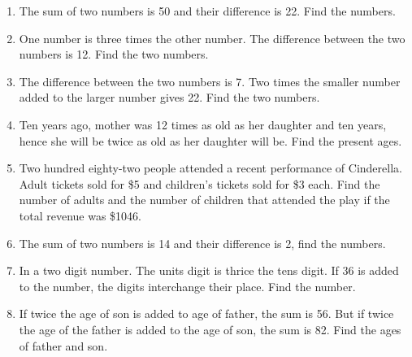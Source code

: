 \documentclass[12pt]{article}
\newenvironment{problem}[2][Problem]{\begin{trivlist}
\item[\hskip \labelsep {\bfseries #1}\hskip \labelsep {\bfseries #2.}]}{\end{trivlist}}
\newenvironment{sol}
    {\emph{Solution:}
    }
    {
    \qed
    }
\begin{document}


\begin{problem}{1}
  \begin{enumerate}[label=\roman*)]
  \item The sum of two numbers is 50 and their difference is 22. Find the numbers.
  \item One number is three times the other number. The difference between the two numbers is 12. Find the two numbers.
  \item The difference between the two numbers is 7. Two times the smaller number added to the larger number gives 22. Find the two numbers.
  \item Ten years ago, mother was 12 times as old as her daughter and ten years, hence she will be twice as old as her daughter will be. Find the present ages.
    \item Two hundred eighty-two people attended a recent performance of Cinderella. Adult tickets sold for \$5
and children’s tickets sold for \$3 each. Find the number of adults and the number of children that attended
the play if the total revenue was \$1046. 
  \item The sum of two numbers is 14 and their difference is 2, find the numbers.
  \item In a two digit number. The units digit is thrice the tens digit. If 36 is added to the number, the digits interchange their place. Find the number.
    
  \item If twice the age of son is added to age of father, the sum is 56. But if twice the age of the father is added to the age of son, the sum is 82. Find the ages of father and son. 

  \end{enumerate}

\end{problem}
\end{document}
